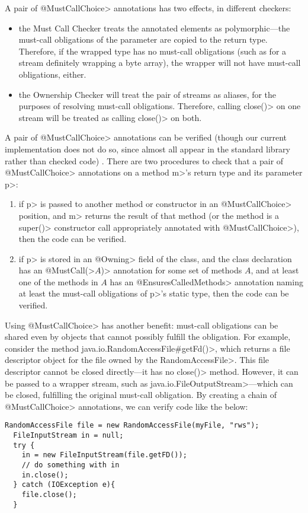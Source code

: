 A pair of \<@MustCallChoice> annotations has two effects, in different
checkers:
\begin{itemize}
\item the Must Call Checker treats the annotated elements as polymorphic---the
  must-call obligations of the parameter are copied to the return type.
  Therefore, if the wrapped type has no must-call obligations (such as
  for a stream definitely wrapping a byte array), the wrapper will not
  have must-call obligations, either.
\item the Ownership Checker will treat the pair of streams as aliases,
  for the purposes of resolving must-call obligations. Therefore, calling
  \<close()> on one stream will be treated as calling \<close()> on both.
\end{itemize}

A pair of \<@MustCallChoice> annotations can be verified (though our current
implementation does not do so, since almost all appear in the standard
library rather than checked code) . There are two
procedures to check
that a pair of \<@MustCallChoice> annotations on a method \<m>'s return type
and its parameter \<p>:
\begin{enumerate}
\item if \<p> is passed to another method or constructor in an
  \<@MustCallChoice> position, and \<m> returns the result of that method
  (or the method is a \<super()> constructor call appropriately annotated
  with \<@MustCallChoice>), then the code can be verified.
\item if \<p> is stored in an \<@Owning> field of the class, and the
  class declaration has an \<@MustCall(>$A$\<)> annotation for some set
  of methods $A$, and at least one of the methods in $A$ has an
  \<@EnsuresCalledMethods> annotation naming at least the
  must-call obligations of \<p>'s static type, then the code can be verified.
\end{enumerate}

Using \<@MustCallChoice> has another benefit: must-call obligations
can be shared even by objects that cannot possibly fulfill the
obligation. For example, consider the method
\<java.io.RandomAccessFile\#getFd()>, which returns a file descriptor
object for the file owned by the \<RandomAccessFile>. This file
descriptor cannot be closed directly---it has no \<close()> method.
However, it can be passed to a wrapper stream, such as
\<java.io.FileOutputStream>---which can be closed, fulfilling
the original must-call obligation. By creating a chain of \<@MustCallChoice>
annotations, we can verify code like the below:

\begin{lstlisting}[frame=tb,belowskip=3mm]
  RandomAccessFile file = new RandomAccessFile(myFile, "rws");
  FileInputStream in = null;
  try {
    in = new FileInputStream(file.getFD());
    // do something with in  
    in.close();
  } catch (IOException e){
    file.close();
  }
\end{lstlisting}
